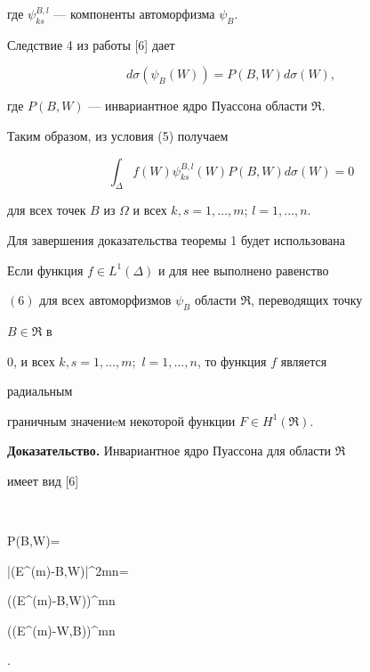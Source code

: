 где $\psi^{B,l}_{k s}$ --- компоненты автоморфизма $\psi_B$. 


 


Следствие 4 из работы [6] дает 


$$ 


d\sigma(\psi_B(W))=P(B,W)d\sigma(W), 


$$ 


где $P(B,W)$ --- инвариантное ядро Пуассона области $\Re$. 


Таким образом, из условия (5) получаем 


\begin{equation} 


\int_\Delta f(W)\psi^{B,l}_{k s}(W)P(B,W)d\sigma(W)=0 


\end{equation} 


для всех точек $B$ из $\Omega$ и всех $k,s=1,\dotsc,m$; $l=1,\dotsc,n$. 


 


Для завершения доказательства теоремы 1 будет использована 


 


\begin{thm} 


Если функция $f\in L^1(\Delta)$ и для нее выполнено равенство 


$(6)$ для всех автоморфизмов $\psi_B$ области $\Re$, переводящих точку 


$B\in \Re$ в 


$0$, и всех $k,s=1,\dotsc,m;$ $l=1,\dotsc,n$, то функция $f$ является 


радиальным 


граничным значениeм некоторой функции $F\in H^1(\Re)$. 


\end{thm} 


 


{\bf Доказательство.} Инвариантное ядро Пуассона для области $\Re$ 


имеет вид [6] 


$$ 


P(B,W)= 


{|\det(E^{(m)}-\la B,W\ra)|^{2mn}}= 




{(\det(E^{(m)}-\la B,W\ra))^{mn} 


(\det(E^{(m)}-\la W,B\ra))^{mn}}. 


